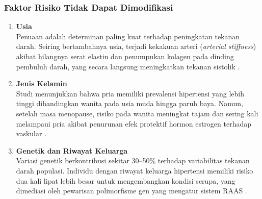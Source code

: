 \subsubsection{Faktor Risiko Tidak Dapat Dimodifikasi}
\begin{enumerate}
    \item \textbf{Usia} \\
    Penuaan adalah determinan paling kuat terhadap peningkatan tekanan darah. Seiring bertambahnya usia, terjadi kekakuan arteri (\textit{arterial stiffness}) akibat hilangnya serat elastin dan penumpukan kolagen pada dinding pembuluh darah, yang secara langsung meningkatkan tekanan sistolik \parencite{Lacolley2020Arterial}.
    
    \item \textbf{Jenis Kelamin} \\
    Studi menunjukkan bahwa pria memiliki prevalensi hipertensi yang lebih tinggi dibandingkan wanita pada usia muda hingga paruh baya. Namun, setelah masa menopause, risiko pada wanita meningkat tajam dan sering kali melampaui pria akibat penurunan efek protektif hormon estrogen terhadap vaskular \parencite{Reckelhoff2021Gender}.
    
    \item \textbf{Genetik dan Riwayat Keluarga} \\
    Variasi genetik berkontribusi sekitar 30--50\% terhadap variabilitas tekanan darah populasi. Individu dengan riwayat keluarga hipertensi memiliki risiko dua kali lipat lebih besar untuk mengembangkan kondisi serupa, yang dimediasi oleh pewarisan polimorfisme gen yang mengatur sistem RAAS \parencite{Padmanabhan2019Genetics}.
\end{enumerate}

